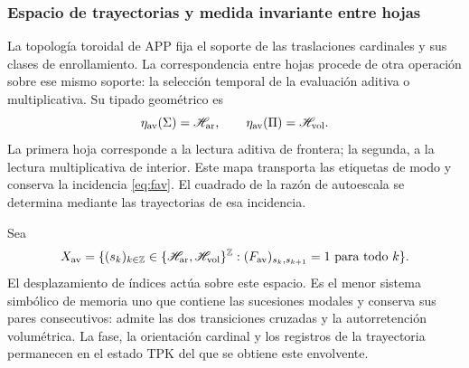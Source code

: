 \subsubsection{Espacio de trayectorias y medida invariante entre hojas}
\label{sec:medida-retorno-hojas}

La topología toroidal de APP fija el soporte de las traslaciones cardinales
y sus clases de enrollamiento. La correspondencia entre hojas procede de
otra operación sobre ese mismo soporte: la selección temporal de la
evaluación aditiva o multiplicativa. Su tipado geométrico es
\[
 \eta_{\rm av}(\Sigma)=\mathscr H_{\rm ar},\qquad
 \eta_{\rm av}(\Pi)=\mathscr H_{\rm vol}.
\]
La primera hoja corresponde a la lectura aditiva de frontera; la segunda,
a la lectura multiplicativa de interior. Este mapa transporta las etiquetas
de modo y conserva la incidencia \eqref{eq:fav}. El cuadrado de la razón
de autoescala se determina mediante las trayectorias de esa incidencia.

\begin{definition}
Sea
\[
 X_{\rm av}=\{(s_k)_{k\in\mathbb Z}\in
 \{\mathscr H_{\rm ar},\mathscr H_{\rm vol}\}^{\mathbb Z}:
 (F_{\rm av})_{s_k,s_{k+1}}=1\text{ para todo }k\}.
\]
El desplazamiento de índices actúa sobre este espacio. Es el menor sistema
simbólico de memoria uno que contiene las sucesiones modales y conserva
sus pares consecutivos: admite las dos transiciones cruzadas y la
autorretención volumétrica. La fase, la orientación cardinal y los registros
de la trayectoria permanecen en el estado TPK del que se obtiene este
envolvente.
\end{definition}

